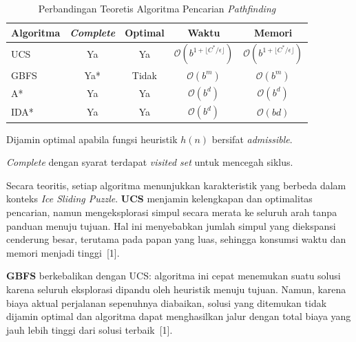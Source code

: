 \documentclass[12pt,a4paper]{article}
\begin{document}
\begin{table}[H]
    \centering
    \caption{Perbandingan Teoretis Algoritma Pencarian \textit{Pathfinding}}
    \label{tab:perbandingan}
    \begin{threeparttable}
        \begin{tabular}{lcccc}
            \toprule
            \textbf{Algoritma} & \textbf{\textit{Complete}} & \textbf{Optimal} & \textbf{Waktu} & \textbf{Memori} \\
            \midrule
            UCS   & Ya  & Ya       & $\mathcal{O}(b^{1+\lfloor C^*/\epsilon \rfloor})$ & $\mathcal{O}(b^{1+\lfloor C^*/\epsilon \rfloor})$ \\
            GBFS  & Ya* & Tidak    & $\mathcal{O}(b^m)$ & $\mathcal{O}(b^m)$ \\
            A*    & Ya  & Ya\tnote{a} & $\mathcal{O}(b^d)$ & $\mathcal{O}(b^d)$ \\
            IDA*  & Ya  & Ya\tnote{a} & $\mathcal{O}(b^d)$ & $\mathcal{O}(bd)$ \\
            \bottomrule
        \end{tabular}
        \begin{tablenotes}
            \footnotesize
            \item[a] Dijamin optimal apabila fungsi heuristik $h(n)$ bersifat \textit{admissible}.
            \item[*] \textit{Complete} dengan syarat terdapat \textit{visited set} untuk mencegah siklus.
        \end{tablenotes}
    \end{threeparttable}
\end{table}

Secara teoritis, setiap algoritma menunjukkan karakteristik yang berbeda dalam
konteks \textit{Ice Sliding Puzzle}. \textbf{UCS} menjamin kelengkapan dan
optimalitas pencarian, namun mengeksplorasi simpul secara merata ke seluruh arah
tanpa panduan menuju tujuan. Hal ini menyebabkan jumlah simpul yang diekspansi
cenderung besar, terutama pada papan yang luas, sehingga konsumsi waktu dan memori
menjadi tinggi~[1].

\textbf{GBFS} berkebalikan dengan UCS: algoritma ini cepat menemukan suatu solusi
karena seluruh eksplorasi dipandu oleh heuristik menuju tujuan. Namun, karena biaya
aktual perjalanan sepenuhnya diabaikan, solusi yang ditemukan tidak dijamin optimal
dan algoritma dapat menghasilkan jalur dengan total biaya yang jauh lebih tinggi
dari solusi terbaik~[1].
\end{document}
